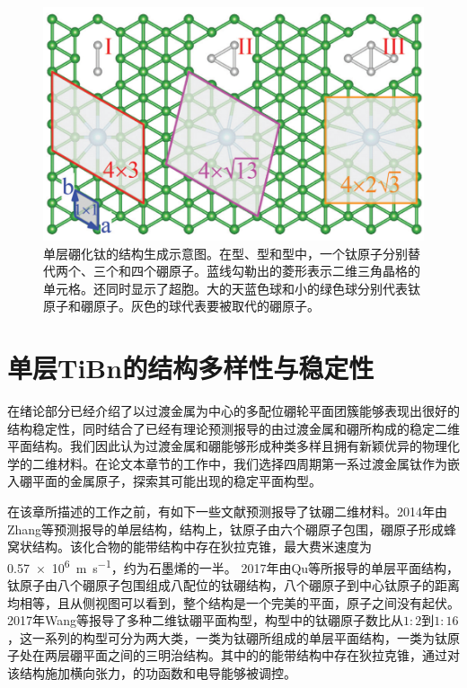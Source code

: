 \begin{figure}
  \includegraphics[width=1.0\textwidth]{figs/ch5_how_cell_choose.png}
  \centering
  \caption{单层硼化钛的结构生成示意图。在型、型和型中，一个钛原子分别替代两个、三个和四个硼原子。蓝线勾勒出的菱形表示二维三角晶格的单元格。还同时显示了超胞。大的天蓝色球和小的绿色球分别代表钛原子和硼原子。灰色的球代表要被取代的硼原子。}
  \label{fig:ch5_how_cell_choose}
\end{figure}

\section{单层TiBn的结构多样性与稳定性}
在绪论部分已经介绍了以过渡金属为中心的多配位硼轮平面团簇能够表现出很好的结构稳定性，同时结合了已经有理论预测报导的由过渡金属和硼所构成的稳定二维平面结构。我们因此认为过渡金属和硼能够形成种类多样且拥有新颖优异的物理化学的二维材料。在论文本章节的工作中，我们选择四周期第一系过渡金属钛作为嵌入硼平面的金属原子，探索其可能出现的稳定平面构型。

在该章所描述的工作之前，有如下一些文献预测报导了钛硼二维材料。2014年由Zhang等预测报导的单层结构\cite{zhang2014prediction}，结构上，钛原子由六个硼原子包围，硼原子形成蜂窝状结构。该化合物的能带结构中存在狄拉克锥，最大费米速度为\SI{0.57e6}{\meter\per\second}，约为石墨烯的一半。
2017年由Qu等所报导的单层平面结构\cite{qu2017two}，钛原子由八个硼原子包围组成八配位的钛硼结构，八个硼原子到中心钛原子的距离均相等，且从侧视图可以看到，整个结构是一个完美的平面，原子之间没有起伏。
2017年Wang\cite{wang2017semimetallic}等报导了多种二维钛硼平面构型，构型中的钛硼原子数比从$1:2$到$1:16$，这一系列的构型可分为两大类，一类为钛硼所组成的单层平面结构，一类为钛原子处在两层硼平面之间的三明治结构。其中的的能带结构中存在狄拉克锥，通过对该结构施加横向张力，的功函数和电导能够被调控。

